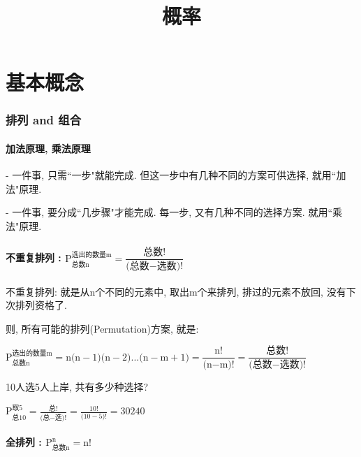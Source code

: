 \documentclass[UTF8]{ctexart}
\title{概率}
\begin{document}
	\tableofcontents %
	\date{} %
	\maketitle  %
	
	\part{基本概念}
	
	
	\section{排列 and 组合}
	
	\subsection{加法原理, 乘法原理}
	
	- 一件事, 只需``一步"就能完成. 但这一步中有几种不同的方案可供选择, 就用``加法"原理.
	
	- 一件事, 要分成``几步骤"才能完成. 每一步, 又有几种不同的选择方案. 就用``乘法"原理.
	
	
	
	\subsection{不重复排列 : $\text{P}_{\text{总数n}}^{\text{选出的数量m}}=\dfrac{\text{总数!}}{\text{(总数}-\text{选数)!}}		$}
	
	不重复排列: 就是从n个不同的元素中, 取出m个来排列, 排过的元素不放回, 没有下次排列资格了. 
	
	则, 所有可能的排列(Permutation)方案, 就是:	
	
	$
		\boxed{		\text{P}_{\text{总数n}}^{\text{选出的数量m}}=\text{n(n}-1\text{)(n}-2\text{)...(n}-\text{m}+1\text{)}=\dfrac{\text{n!}}{\text{(n}-\text{m)!}}=\dfrac{\text{总数!}}{\text{(总数}-\text{选数)!}} 
		}
	$
	
	\begin{myEnvSample}
		10人选5人上岸, 共有多少种选择?
		
		$
		\text{P}_{\text{总}10}^{\text{取}5}=\frac{\text{总!}}{\text{(总}-\text{选)!}}=\frac{10!}{\text{(}10-5\text{)!}}=30240
		$
	\end{myEnvSample}
	
	
	
	
	
	\subsection{全排列 : $\text{P}_{\text{总数n}}^{\text{n}}=\text{n!}	$ }
	
\end{document}
